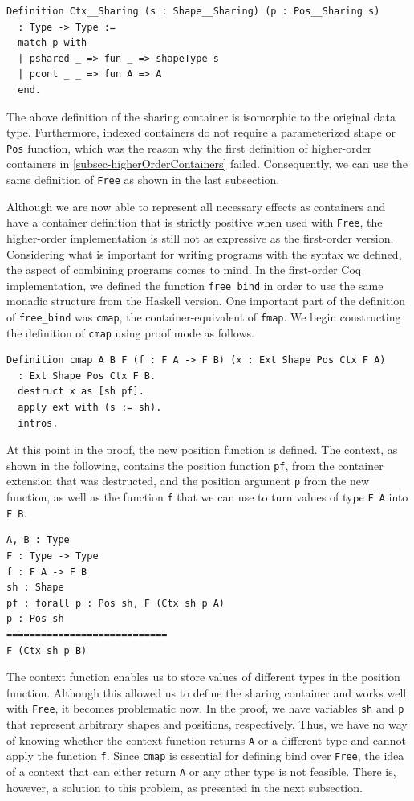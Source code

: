 \documentclass[a4paper, 11pt, fleqn, twoside]{scrreprt}
\newcommand{\cinl}[1]{\texttt{#1}}
\begin{document}
\begin{verbatim}
Definition Ctx__Sharing (s : Shape__Sharing) (p : Pos__Sharing s) 
  : Type -> Type :=
  match p with
  | pshared _ => fun _ => shapeType s
  | pcont _ _ => fun A => A
  end.
\end{verbatim}

The above definition of the sharing container is isomorphic to the original data type.
Furthermore, indexed containers do not require a parameterized shape or \cinl{Pos} function, which was the reason why the first definition of higher-order containers in \autoref{subsec-higherOrderContainers} failed.
Consequently, we can use the same definition of \cinl{Free} as shown in the last subsection.

Although we are now able to represent all necessary effects as containers and have a container definition that is strictly positive when used with \cinl{Free}, the higher-order implementation is still not as expressive as the first-order version.
Considering what is important for writing programs with the syntax we defined, the aspect of combining programs comes to mind.
In the first-order Coq implementation, we defined the function \cinl{free_bind} in order to use the same monadic structure from the Haskell version.
One important part of the definition of \cinl{free_bind} was \cinl{cmap}, the container-equivalent of \cinl{fmap}.
We begin constructing the definition of \cinl{cmap} using proof mode as follows.

\begin{verbatim}
Definition cmap A B F (f : F A -> F B) (x : Ext Shape Pos Ctx F A) 
  : Ext Shape Pos Ctx F B.
  destruct x as [sh pf].
  apply ext with (s := sh).
  intros.
\end{verbatim}

At this point in the proof, the new position function is defined.
The context, as shown in the following, contains the position function \cinl{pf}, from the container extension that was destructed, and the position argument \cinl{p} from the new function, as well as the function \cinl{f} that we can use to turn values of type \cinl{F A} into \cinl{F B}.

\begin{verbatim}
A, B : Type
F : Type -> Type
f : F A -> F B
sh : Shape
pf : forall p : Pos sh, F (Ctx sh p A)
p : Pos sh
============================
F (Ctx sh p B)
\end{verbatim}

The context function enables us to store values of different types in the position function.
Although this allowed us to define the sharing container and works well with \cinl{Free}, it becomes problematic now.
In the proof, we have variables \cinl{sh} and \cinl{p} that represent arbitrary shapes and positions, respectively.
Thus, we have no way of knowing whether the context function returns \cinl{A} or a different type and cannot apply the function \cinl{f}.
Since \cinl{cmap} is essential for defining bind over \cinl{Free}, the idea of a context that can either return \cinl{A} or any other type is not feasible.
There is, however, a solution to this problem, as presented in the next subsection.
\end{document}
